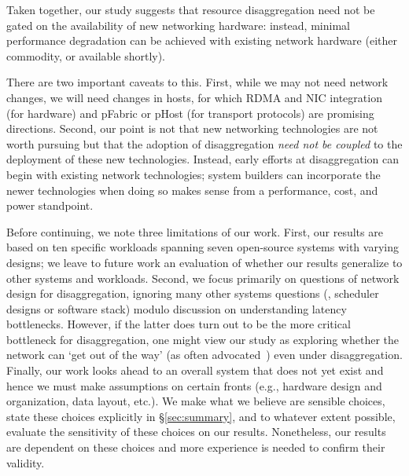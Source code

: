 \noindent
Taken together, our study suggests that resource disaggregation need not be gated on the availability of new networking hardware: instead, minimal performance degradation can be achieved with existing network hardware (either commodity, or available shortly).

There are two important caveats to this.  First, while we may not need network changes, we will need changes in hosts, for which RDMA and NIC integration (for hardware) and pFabric or pHost (for transport protocols) are promising directions. Second, our point is not that new networking technologies are not worth pursuing but that the adoption of disaggregation \emph{need not be coupled} to the deployment of these new technologies. Instead, early efforts at disaggregation can begin with existing network technologies; system builders can incorporate the newer technologies when doing so makes sense from a performance, cost, and power standpoint.

Before continuing, we note three limitations of our work. First, our results are based on ten specific workloads spanning seven open-source systems with varying designs; we leave to future work an evaluation of whether our results generalize to other systems and workloads.
Second, we focus primarily on questions of network design for disaggregation, ignoring many other systems questions (\eg, scheduler designs or software stack) modulo discussion on understanding latency bottlenecks. However, if the latter does turn out to be the more critical bottleneck for disaggregation, one might view our study as exploring whether the network can `get out of the way' (as often advocated~\cite{greenberg-sigcomm15}) even under disaggregation. Finally, our work looks ahead to an overall system that does not yet exist and hence we must make assumptions on certain fronts (e.g., hardware design and organization, data layout, etc.). We make what we believe are sensible choices, state these choices explicitly in \S\ref{sec:summary}, and to whatever extent possible, evaluate the sensitivity of these choices on our results. Nonetheless, our results are dependent on these choices and more experience is needed to confirm their validity.

